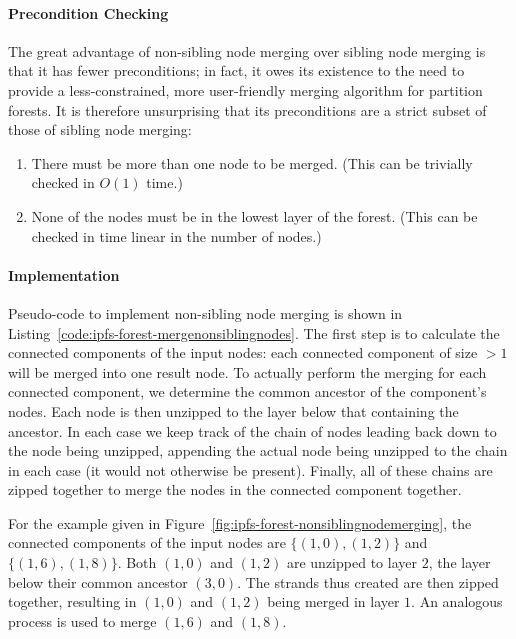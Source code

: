 \paragraph{Precondition Checking}

The great advantage of non-sibling node merging over sibling node merging is that it has fewer preconditions; in fact, it owes its existence to the need to provide a less-constrained, more user-friendly merging algorithm for partition forests. It is therefore unsurprising that its preconditions are a strict subset of those of sibling node merging:

\begin{enumerate}

\item There must be more than one node to be merged. (This can be trivially checked in $O(1)$ time.)
\item None of the nodes must be in the lowest layer of the forest. (This can be checked in time linear in the number of nodes.)

\end{enumerate}

\paragraph{Implementation}

Pseudo-code to implement non-sibling node merging is shown in Listing~\ref{code:ipfs-forest-mergenonsiblingnodes}. The first step is to calculate the connected components of the input nodes: each connected component of size $> 1$ will be merged into one result node. To actually perform the merging for each connected component, we determine the common ancestor of the component's nodes. Each node is then unzipped to the layer below that containing the ancestor. In each case we keep track of the chain of nodes leading back down to the node being unzipped, appending the actual node being unzipped to the chain in each case (it would not otherwise be present). Finally, all of these chains are zipped together to merge the nodes in the connected component together.

For the example given in Figure~\ref{fig:ipfs-forest-nonsiblingnodemerging}, the connected components of the input nodes are $\{(1,0), (1,2)\}$ and $\{(1,6), (1,8)\}$. Both $(1,0)$ and $(1,2)$ are unzipped to layer $2$, the layer below their common ancestor $(3,0)$. The strands thus created are then zipped together, resulting in $(1,0)$ and $(1,2)$ being merged in layer $1$. An analogous process is used to merge $(1,6)$ and $(1,8)$.

